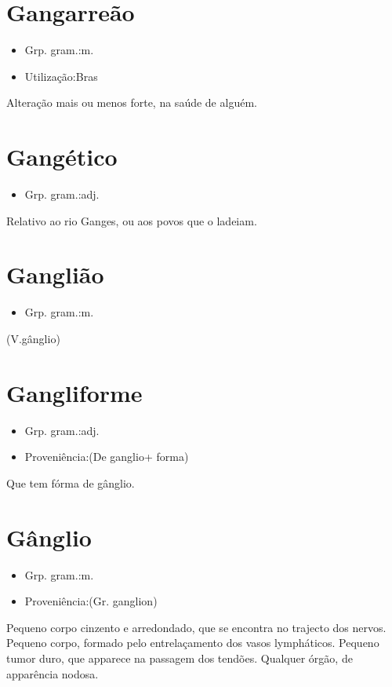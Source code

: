\section{Gangarreão}
\begin{itemize}
\item {Grp. gram.:m.}
\end{itemize}
\begin{itemize}
\item {Utilização:Bras}
\end{itemize}
Alteração mais ou menos forte, na saúde de alguém.
\section{Gangético}
\begin{itemize}
\item {Grp. gram.:adj.}
\end{itemize}
Relativo ao rio Ganges, ou aos povos que o ladeiam.
\section{Ganglião}
\begin{itemize}
\item {Grp. gram.:m.}
\end{itemize}
(V.gânglio)
\section{Gangliforme}
\begin{itemize}
\item {Grp. gram.:adj.}
\end{itemize}
\begin{itemize}
\item {Proveniência:(De \textunderscore ganglio\textunderscore  + \textunderscore forma\textunderscore )}
\end{itemize}
Que tem fórma de gânglio.
\section{Gânglio}
\begin{itemize}
\item {Grp. gram.:m.}
\end{itemize}
\begin{itemize}
\item {Proveniência:(Gr. \textunderscore ganglion\textunderscore )}
\end{itemize}
Pequeno corpo cinzento e arredondado, que se encontra no trajecto dos nervos.
Pequeno corpo, formado pelo entrelaçamento dos vasos lympháticos.
Pequeno tumor duro, que apparece na passagem dos tendões.
Qualquer órgão, de apparência nodosa.
